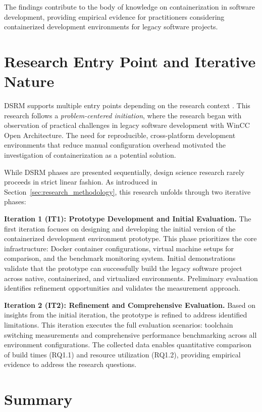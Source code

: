 The findings contribute to the body of knowledge on containerization in software development, providing empirical evidence for practitioners considering containerized development environments for legacy software projects.

\section{Research Entry Point and Iterative Nature}

DSRM supports multiple entry points depending on the research context \citep{peffersDesignScienceResearch2007}.
This research follows a \textit{problem-centered initiation}, where the research began with observation of practical challenges in legacy software development with WinCC Open Architecture.
The need for reproducible, cross-platform development environments that reduce manual configuration overhead motivated the investigation of containerization as a potential solution.

While DSRM phases are presented sequentially, design science research rarely proceeds in strict linear fashion.
As introduced in Section~\ref{sec:research_methodology}, this research unfolds through two iterative phases:

\textbf{Iteration 1 (IT1): Prototype Development and Initial Evaluation.}
The first iteration focuses on designing and developing the initial version of the containerized development environment prototype.
This phase prioritizes the core infrastructure: Docker container configurations, virtual machine setups for comparison, and the benchmark monitoring system.
Initial demonstrations validate that the prototype can successfully build the legacy software project across native, containerized, and virtualized environments.
Preliminary evaluation identifies refinement opportunities and validates the measurement approach.

\textbf{Iteration 2 (IT2): Refinement and Comprehensive Evaluation.}
Based on insights from the initial iteration, the prototype is refined to address identified limitations.
This iteration executes the full evaluation scenarios: toolchain switching measurements and comprehensive performance benchmarking across all environment configurations.
The collected data enables quantitative comparison of build times (RQ1.1) and resource utilization (RQ1.2), providing empirical evidence to address the research questions.

\section{Summary}

